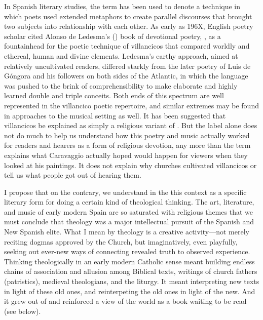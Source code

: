 In Spanish literary studies, the term  has been used to
denote a technique in which poets used extended metaphors to create parallel
discourses that brought two subjects into relationship with each other.
As early as 196X\XXX[name], English poetry scholar \XXX[name] cited Alonso de
Ledesma's (\XXX[year]) book of devotional poetry, , as a fountainhead for the poetic technique of villancicos that
compared worldly and ethereal, human and divine elements.%
Ledesma's earthy approach, aimed at relatively uncultivated readers, differed
starkly from the later  poetry of Luis de Góngora and his
followers on both sides of the Atlantic, in which the language was pushed to
the brink of comprehensibility to make elaborate and highly learned double and
triple conceits.%
    \citXXX[Gongora]
Both ends of this spectrum are well represented in the villancico poetic
repertoire, and similar extremes may be found in approaches to the musical
setting as well.
It has been suggested that villancicos be explained as simply a religious
variant of .%
But the label  alone does not do much to help us understand
how this poetry and music actually worked for readers and hearers as a form of
religious devotion, any more than the term  explains what
Caravaggio actually hoped would happen for viewers when they looked at his
paintings.%
It does not explain why churches cultivated villancicos or tell us what people
got out of hearing them.

I propose that on the contrary, we understand  in the this
context as a specific literary form for doing a certain kind of theological
thinking.
The art, literature, and music of early modern Spain are so saturated with
religious themes that we must conclude that theology was a major intellectual
pursuit of the Spanish and New Spanish elite.
What I mean by theology is a creative activity---not merely reciting dogmas
approved by the Church, but imaginatively, even playfully, seeking out ever-new
ways of connecting revealed truth to observed experience.
Thinking theologically in an early modern Catholic sense meant building 
endless chains of association and allusion among Biblical texts, writings of
church fathers (patristics), medieval theologians, and the liturgy. 
It meant interpreting new texts in light of these old ones, and reinterpeting
the old ones in light of the new.
And it grew out of and reinforced a view of the world as a book waiting to be
read (see below).

